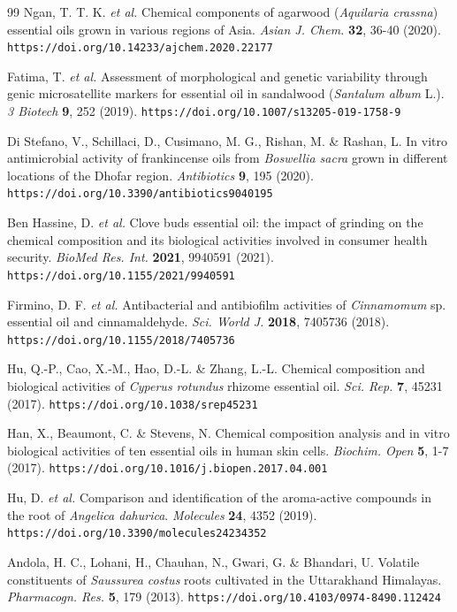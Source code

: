 \documentclass[12pt]{article}
\begin{document}
\begin{thebibliography}{99}
Ngan, T. T. K. \emph{et al.} Chemical components of agarwood (\emph{Aquilaria crassna}) essential oils grown in various regions of Asia. \emph{Asian J. Chem.} \textbf{32}, 36-40 (2020). \nolinkurl{https://doi.org/10.14233/ajchem.2020.22177}

Fatima, T. \emph{et al.} Assessment of morphological and genetic variability through genic microsatellite markers for essential oil in sandalwood (\emph{Santalum album} L.). \emph{3 Biotech} \textbf{9}, 252 (2019). \nolinkurl{https://doi.org/10.1007/s13205-019-1758-9}

Di Stefano, V., Schillaci, D., Cusimano, M. G., Rishan, M. \& Rashan, L. In vitro antimicrobial activity of frankincense oils from \emph{Boswellia sacra} grown in different locations of the Dhofar region. \emph{Antibiotics} \textbf{9}, 195 (2020). \nolinkurl{https://doi.org/10.3390/antibiotics9040195}

Ben Hassine, D. \emph{et al.} Clove buds essential oil: the impact of grinding on the chemical composition and its biological activities involved in consumer health security. \emph{BioMed Res. Int.} \textbf{2021}, 9940591 (2021). \nolinkurl{https://doi.org/10.1155/2021/9940591}

Firmino, D. F. \emph{et al.} Antibacterial and antibiofilm activities of \emph{Cinnamomum} sp. essential oil and cinnamaldehyde. \emph{Sci. World J.} \textbf{2018}, 7405736 (2018). \nolinkurl{https://doi.org/10.1155/2018/7405736}

Hu, Q.-P., Cao, X.-M., Hao, D.-L. \& Zhang, L.-L. Chemical composition and biological activities of \emph{Cyperus rotundus} rhizome essential oil. \emph{Sci. Rep.} \textbf{7}, 45231 (2017). \nolinkurl{https://doi.org/10.1038/srep45231}

Han, X., Beaumont, C. \& Stevens, N. Chemical composition analysis and in vitro biological activities of ten essential oils in human skin cells. \emph{Biochim. Open} \textbf{5}, 1-7 (2017). \nolinkurl{https://doi.org/10.1016/j.biopen.2017.04.001}

Hu, D. \emph{et al.} Comparison and identification of the aroma-active compounds in the root of \emph{Angelica dahurica}. \emph{Molecules} \textbf{24}, 4352 (2019). \nolinkurl{https://doi.org/10.3390/molecules24234352}

Andola, H. C., Lohani, H., Chauhan, N., Gwari, G. \& Bhandari, U. Volatile constituents of \emph{Saussurea costus} roots cultivated in the Uttarakhand Himalayas. \emph{Pharmacogn. Res.} \textbf{5}, 179 (2013). \nolinkurl{https://doi.org/10.4103/0974-8490.112424}


\end{thebibliography}
\end{document}
